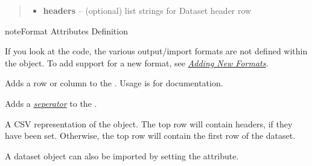 \documentclass[a4paper,12pt,english]{sphinxmanual}
\begin{document}
\begin{fulllineitems}
\begin{quote}
\begin{description}
\begin{itemize}
\item {} 
\textbf{headers} -- (optional) list strings for Dataset header row

\end{itemize}

\end{description}\end{quote}

\begin{notice}{note}{Format Attributes Definition}

If you look at the code, the various output/import formats are not
defined within the {\hyperref[api:tablib.Dataset]{}} object. To add support for a new format, see
{\hyperref[development:newformats]{\emph{Adding New Formats}}}.
\end{notice}

\begin{fulllineitems}
\label{api:tablib.Dataset.append}
Adds a row or column to the {\hyperref[api:tablib.Dataset]{}}.
Usage is  {\hyperref[api:tablib.Dataset.insert]{}} for documentation.

\end{fulllineitems}


\begin{fulllineitems}
\label{api:tablib.Dataset.append_separator}
Adds a {\hyperref[tutorial:seperators]{\emph{seperator}}} to the {\hyperref[api:tablib.Dataset]{}}.

\end{fulllineitems}


\begin{fulllineitems}
\label{api:tablib.Dataset.csv}
A CSV representation of the {\hyperref[api:tablib.Dataset]{}} object. The top row will contain
headers, if they have been set. Otherwise, the top row will contain
the first row of the dataset.

A dataset object can also be imported by setting the {\hyperref[api:tablib.Dataset.csv]{}} attribute.


\end{fulllineitems}
\end{fulllineitems}
\end{document}
